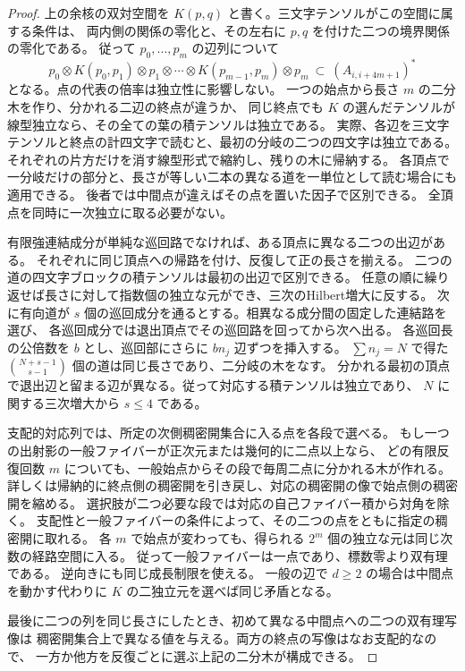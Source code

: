 \begin{proof}
上の余核の双対空間を $K(p,q)$ と書く。三文字テンソルがこの空間に属する条件は、
両内側の関係の零化と、その左右に $p,q$ を付けた二つの境界関係の零化である。
従って $p_0,\ldots,p_m$ の辺列について
\[
 p_0\otimes K(p_0,p_1)\otimes p_1\otimes\cdots
        \otimes K(p_{m-1},p_m)\otimes p_m
 \ \subset\ (A_{i,i+4m+1})^*
\]
となる。点の代表の倍率は独立性に影響しない。
一つの始点から長さ $m$ の二分木を作り、分かれる二辺の終点が違うか、
同じ終点でも $K$ の選んだテンソルが線型独立なら、その全ての葉の積テンソルは独立である。
実際、各辺を三文字テンソルと終点の計四文字で読むと、最初の分岐の二つの四文字は独立である。
それぞれの片方だけを消す線型形式で縮約し、残りの木に帰納する。
各頂点で一分岐だけの部分と、長さが等しい二本の異なる道を一単位として読む場合にも適用できる。
後者では中間点が違えばその点を置いた因子で区別できる。
全頂点を同時に一次独立に取る必要がない。

有限強連結成分が単純な巡回路でなければ、ある頂点に異なる二つの出辺がある。
それぞれに同じ頂点への帰路を付け、反復して正の長さを揃える。
二つの道の四文字ブロックの積テンソルは最初の出辺で区別できる。
任意の順に繰り返せば長さに対して指数個の独立な元ができ、三次のHilbert増大に反する。
次に有向道が $s$ 個の巡回成分を通るとする。相異なる成分間の固定した連結路を選び、
各巡回成分では退出頂点でその巡回路を回ってから次へ出る。
各巡回長の公倍数を $b$ とし、巡回部にさらに $b n_j$ 辺ずつを挿入する。
$\sum n_j=N$ で得た $\binom{N+s-1}{s-1}$ 個の道は同じ長さであり、二分岐の木をなす。
分かれる最初の頂点で退出辺と留まる辺が異なる。従って対応する積テンソルは独立であり、
$N$ に関する三次増大から $s\le4$ である。

支配的対応列では、所定の次側稠密開集合に入る点を各段で選べる。
もし一つの出射影の一般ファイバーが正次元または幾何的に二点以上なら、
どの有限反復回数 $m$ についても、一般始点からその段で毎周二点に分かれる木が作れる。
詳しくは帰納的に終点側の稠密開を引き戻し、対応の稠密開の像で始点側の稠密開を縮める。
選択肢が二つ必要な段では対応の自己ファイバー積から対角を除く。
支配性と一般ファイバーの条件によって、その二つの点をともに指定の稠密開に取れる。
各 $m$ で始点が変わっても、得られる $2^m$ 個の独立な元は同じ次数の経路空間に入る。
従って一般ファイバーは一点であり、標数零より双有理である。
逆向きにも同じ成長制限を使える。
一般の辺で $d\ge2$ の場合は中間点を動かす代わりに $K$ の二独立元を選べば同じ矛盾となる。

最後に二つの列を同じ長さにしたとき、初めて異なる中間点への二つの双有理写像は
稠密開集合上で異なる値を与える。両方の終点の写像はなお支配的なので、
一方か他方を反復ごとに選ぶ上記の二分木が構成できる。
\end{proof}

